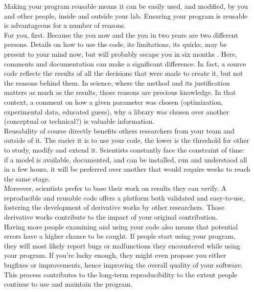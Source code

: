 \documentclass[a4paper,11pt]{article}
\begin{document}
Making your program reusable means it can be easily used, and modified, by you and other people, inside and outside your lab. Ensuring your program is reusable is advantageous for a number of reasons.\\

For you, first. Because the you now and the you in two years are two different persons. Details on how to use the code, its limitations, its quirks, may be present to your mind now, but will probably escape you in six months \parencite{Donoho:2009}. Here, comments and documentation can make a significant difference. In fact, a source code reflects the results of all the decisions that were made to create it, but not the reasons behind them. In science, where the method and its justification matters as much as the results, those reasons are precious knowledge. In that context, a comment on how a given parameter was chosen (optimization, experimental data, educated guess), why a library was chosen over another (conceptual or technical?) is valuable information.\\

Reusability of course directly benefits others researchers from your team and outside of it. The easier it is to use your code, the lower is the threshold for other to study, modify and extend it. Scientists constantly face the constraint of time: if a model is available, documented, and can be installed, run and understood all in a few hours, it will be preferred over another that would require weeks to reach the same stage.\\

Moreover, scientists prefer to base their work on results they can verify. A reproducible and reusable code offers a platform both validated and easy-to-use, fostering the development of derivative works by other researchers. Those derivative works contribute to the impact of your original contribution.\\

Having more people examining and using your code also means that potential errors have a higher chance to be caught. If people start using your program, they will most likely report bugs or malfunctions they encountered while using your program. If you're lucky enough, they might even propose you either bugfixes or improvements, hence improving the overall quality of your software. This process contributes to the long-term reproducibility to the extent people continue to use and maintain the program.\\
\end{document}
